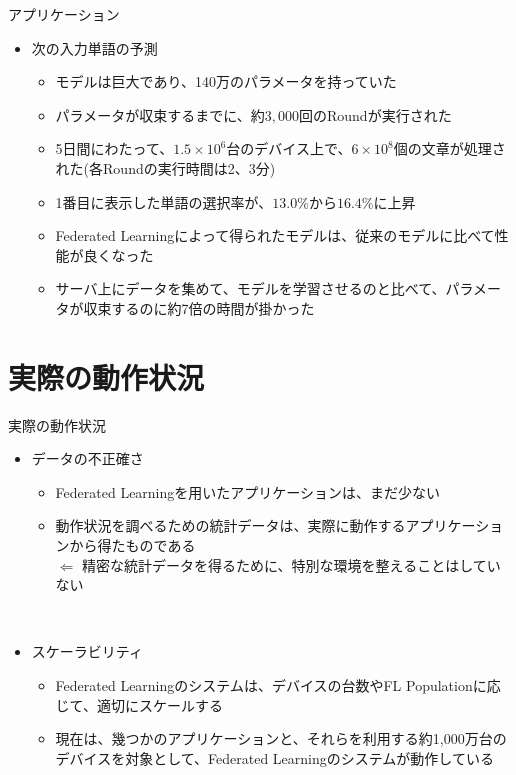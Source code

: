 \documentclass[dvipdfmx,notheorems,t]{beamer}
\begin{document}
\begin{frame}{アプリケーション}

\begin{itemize}
	\item 次の入力単語の予測
	\begin{itemize}
		\item モデルは巨大であり、140万のパラメータを持っていた
		\item パラメータが収束するまでに、約$3,000$回のRoundが実行された
		\item 5日間にわたって、$1.5 \times 10^6$台のデバイス上で、$6 \times 10^8$個の文章が処理された(各Roundの実行時間は2、3分)
		\newline
		
		\item 1番目に表示した単語の選択率が、$13.0\%$から$16.4\%$に上昇
		\item Federated Learningによって得られたモデルは、従来のモデルに比べて性能が良くなった
		\newline
		
		\item サーバ上にデータを集めて、モデルを学習させるのと比べて、パラメータが収束するのに約7倍の時間が掛かった
	\end{itemize}
\end{itemize}

\end{frame}

\section{実際の動作状況}

\begin{frame}{実際の動作状況}

\begin{itemize}
	\item データの不正確さ
	\begin{itemize}
		\item Federated Learningを用いたアプリケーションは、まだ少ない
		\item 動作状況を調べるための統計データは、実際に動作するアプリケーションから得たものである \\
		$\Leftarrow$ 精密な統計データを得るために、特別な環境を整えることはしていない
	\end{itemize} \
	
	\item スケーラビリティ
	\begin{itemize}
		\item Federated Learningのシステムは、デバイスの台数やFL Populationに応じて、適切にスケールする
		\item 現在は、幾つかのアプリケーションと、それらを利用する約1,000万台のデバイスを対象として、Federated Learningのシステムが動作している
	\end{itemize}
\end{itemize}

\end{frame}
\end{document}
